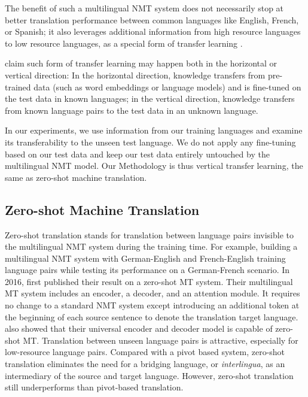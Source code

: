 \documentclass[thesis]{cluu}
\begin{document}
The benefit of such a multilingual NMT system does not necessarily stop at better translation performance between common languages like English, French, or Spanish; it also leverages additional information from high resource languages to low resource languages, as a special form of transfer learning \parencite{Zoph:2016aa}.

\textcite{Lakew:2019aa} claim such form of transfer learning may happen both in the horizontal or vertical direction: In the horizontal direction, knowledge transfers from pre-trained data (such as word embeddings or language models) and is fine-tuned on the test data in known languages; in the vertical direction, knowledge transfers from known language pairs to the test data in an unknown language.

In our experiments, we use information from our training languages and examine its transferability to the unseen test language. We do not apply any fine-tuning based on our test data and keep our test data entirely untouched by the multilingual NMT model. Our Methodology is thus vertical transfer learning, the same as zero-shot machine translation.

\subsection{Zero-shot Machine Translation}
\label{sec:zero_shot_mt}

Zero-shot translation stands for translation between language pairs invisible to the multilingual NMT system during the training time. For example, building a multilingual NMT system with German-English and French-English training language pairs while testing its performance on a German-French scenario. In 2016, \textcite{Johnson:2016aa} first published their result on a zero-shot MT system. Their multilingual MT system includes an encoder, a decoder, and an attention module. It requires no change to a standard NMT system except introducing an additional token at the beginning of each source sentence to denote the translation target language. \textcite{Ha:2016aa} also showed that their universal encoder and decoder model is capable of zero-shot MT. Translation between unseen language pairs is attractive, especially for low-resource language pairs. Compared with a pivot based system, zero-shot translation eliminates the need for a bridging language, or \textit{interlingua}, as an intermediary of the source and target language. However, zero-shot translation still underperforms than pivot-based translation.
\end{document}
